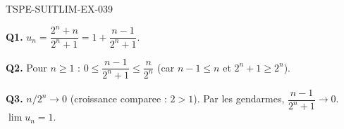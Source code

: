 \begin{corrige}{TSPE-SUITLIM-EX-039}

\textbf{Q1.} $u_n = \dfrac{2^n+n}{2^n+1} = 1 + \dfrac{n-1}{2^n+1}$.

\textbf{Q2.} Pour $n \geq 1$ : $0 \leq \dfrac{n-1}{2^n+1} \leq \dfrac{n}{2^n}$ (car $n-1 \leq n$ et $2^n+1 \geq 2^n$).

\textbf{Q3.} $n/2^n \to 0$ (croissance comparee : $2>1$). Par les gendarmes, $\dfrac{n-1}{2^n+1} \to 0$. $\boxed{\lim u_n = 1}$.

\end{corrige}
